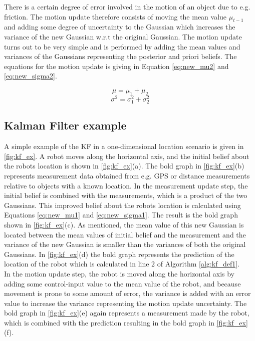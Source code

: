 There is a certain degree of error involved in the motion of an object due to e.g. friction. The motion update therefore consists of moving the mean value $\mu_{t-1}$ and adding some degree of uncertainty to the Gaussian which increases the variance of the new Gaussian w.r.t the original Gaussian. The motion update turns out to be very simple and is performed by adding the mean values and variances of the Gaussians representing the posterior and priori beliefs. The equations for the motion update is giving in Equation \ref{eq:new_mu2} and \ref{eq:new_sigma2}.

\begin{equation}
\label{eq:new_mu2}
\mu = \mu_{1} + \mu_{2}
\end{equation}
\begin{equation}
\label{eq:new_sigma2}
\sigma^2 = \sigma_{1}^2 + \sigma_{2}^2
\end{equation}

\subsection{Kalman Filter example}

A simple example of the KF in a one-dimensional location scenario is given in \autoref{fig:kf_ex}. A robot moves along the horizontal axis, and the initial belief about the robots location is shown in \autoref{fig:kf_ex}(a). The bold graph in \autoref{fig:kf_ex}(b) represents measurement data obtained from e.g. GPS or distance measurements relative to objects with a known location. In the measurement update step, the initial belief is combined with the measurements, which is a product of the two Gaussians. This improved belief about the robots location is calculated using Equations \ref{eq:new_mu1} and \ref{eq:new_sigma1}. The result is the bold graph shown in \autoref{fig:kf_ex}(c). As mentioned, the mean value of this new Gaussian is located between the mean values of initial belief and the measurement and the variance of the new Gaussian is smaller than the variances of both the original Gaussians. In \autoref{fig:kf_ex}(d) the bold graph represents the prediction of the location of the robot which is calculated in line 2 of Algorithm \autoref{alg:kf_def1}. \\

In the motion update step, the robot is moved along the horizontal axis by adding some control-input value to the mean value of the robot, and because movement is prone to some amount of error, the variance is added with an error value to increase the variance representing the motion update uncertainty. The bold graph in \autoref{fig:kf_ex}(e) again represents a measurement made by the robot, which is combined with the prediction resulting in the bold graph in \autoref{fig:kf_ex}(f).

